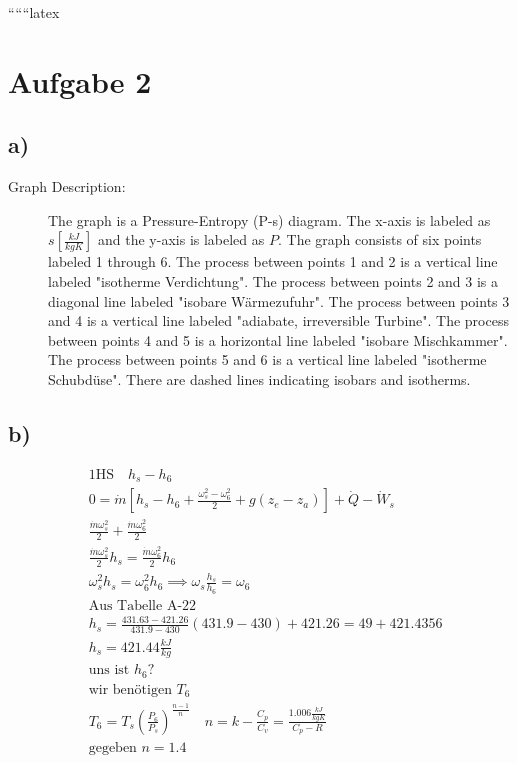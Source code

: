 
``````latex


\section*{Aufgabe 2}

\subsection*{a)}

\begin{description}
    \item[Graph Description:] The graph is a Pressure-Entropy (P-s) diagram. The x-axis is labeled as $s \left[ \frac{kJ}{kgK} \right]$ and the y-axis is labeled as $P$. The graph consists of six points labeled 1 through 6. The process between points 1 and 2 is a vertical line labeled "isotherme Verdichtung". The process between points 2 and 3 is a diagonal line labeled "isobare Wärmezufuhr". The process between points 3 and 4 is a vertical line labeled "adiabate, irreversible Turbine". The process between points 4 and 5 is a horizontal line labeled "isobare Mischkammer". The process between points 5 and 6 is a vertical line labeled "isotherme Schubdüse". There are dashed lines indicating isobars and isotherms.
\end{description}

\subsection*{b)}

\begin{align*}
    &\text{1HS} \quad h_s - h_6 \\
    &0 = \dot{m} \left[ h_s - h_6 + \frac{\omega_s^2 - \omega_6^2}{2} + g(z_e - z_a) \right] + \dot{Q} - \dot{W}_s \\
    &\frac{\dot{m} \omega_s^2}{2} + \frac{\dot{m} \omega_6^2}{2} \\
    &\frac{\dot{m} \omega_s^2}{2} h_s = \frac{\dot{m} \omega_6^2}{2} h_6 \\
    &\omega_s^2 h_s = \omega_6^2 h_6 \implies \omega_s \frac{h_s}{h_6} = \omega_6 \\
    &\text{Aus Tabelle A-22} \\
    &h_s = \frac{431.63 - 421.26}{431.9 - 430} (431.9 - 430) + 421.26 = 49 + 421.4356 \\
    &h_s = 421.44 \frac{kJ}{kg} \\
    &\text{uns ist } h_6? \\
    &\text{wir benötigen } T_6 \\
    &T_6 = T_s \left( \frac{P_6}{P_s} \right)^{\frac{n-1}{n}} \quad n = k - \frac{C_p}{C_v} = \frac{1.006 \frac{kJ}{kgK}}{C_p - R} \\
    &\text{gegeben } n = 1.4
\end{align*}

